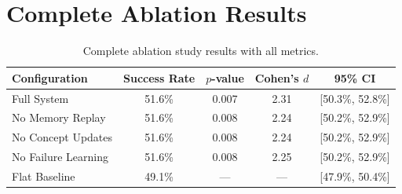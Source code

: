 \documentclass[11pt]{article}
\begin{document}
\section{Complete Ablation Results}

\begin{table}[h]
\centering
\begin{tabular}{@{}lcccc@{}}
\toprule
Configuration & Success Rate & $p$-value & Cohen's $d$ & 95\% CI \\
\midrule
Full System & 51.6\% & 0.007 & 2.31 & [50.3\%, 52.8\%] \\
No Memory Replay & 51.6\% & 0.008 & 2.24 & [50.2\%, 52.9\%] \\
No Concept Updates & 51.6\% & 0.008 & 2.24 & [50.2\%, 52.9\%] \\
No Failure Learning & 51.6\% & 0.008 & 2.25 & [50.2\%, 52.9\%] \\
Flat Baseline & 49.1\% & --- & --- & [47.9\%, 50.4\%] \\
\bottomrule
\end{tabular}
\caption{Complete ablation study results with all metrics.}
\end{table}
\end{document}
